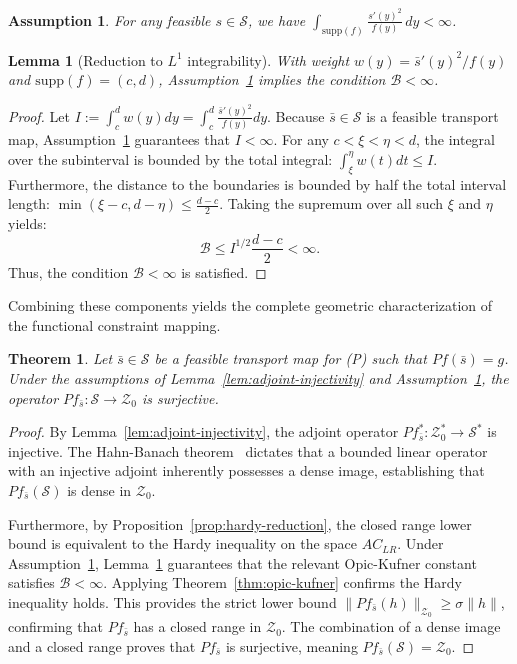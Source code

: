 \documentclass[12pt,leqno]{amsart}
\newtheorem{theorem}{Theorem}
\newtheorem{assumption}{Assumption}
\newtheorem{lemma}{Lemma}
\begin{document}
\begin{assumption}\label{ass:hardy}
For any feasible $s\in\mathcal{S}$, we have $\int_{\mathrm{supp}(f)} \frac{s'(y)^2}{f(y)}\,dy < \infty$.
\end{assumption}

\begin{lemma}[Reduction to $L^1$ integrability]\label{lem:L1-reduction}
With weight $w(y) = \bar{s}'(y)^2/f(y)$ and $\mathrm{supp}(f) = (c,d)$, Assumption~\ref{ass:hardy} implies the condition $\mathcal{B} < \infty$.
\end{lemma}
\begin{proof}
Let $I := \int_c^d w(y)dy = \int_c^d \frac{\bar{s}'(y)^2}{f(y)}dy$. Because $\bar{s} \in \mathcal{S}$ is a feasible transport map, Assumption~\ref{ass:hardy} guarantees that $I < \infty$. For any $c < \xi < \eta < d$, the integral over the subinterval is bounded by the total integral: $\int_\xi^\eta w(t)dt \le I$. Furthermore, the distance to the boundaries is bounded by half the total interval length: $\min(\xi-c, d-\eta) \le \frac{d-c}{2}$. 
Taking the supremum over all such $\xi$ and $\eta$ yields:
\[
\mathcal{B} \le I^{1/2} \frac{d-c}{2} < \infty.
\]
Thus, the condition $\mathcal{B} < \infty$ is satisfied.
\end{proof}

Combining these components yields the complete geometric characterization of the functional constraint mapping.

\begin{theorem}\label{thm:pf-surjectivity}
Let $\bar{s} \in \mathcal{S}$ be a feasible transport map for (P) such that $Pf(\bar{s})=g$. Under the assumptions of Lemma~\ref{lem:adjoint-injectivity} and Assumption~\ref{ass:hardy}, the operator $Pf_{\bar{s}} : \mathcal{S} \to \mathcal{Z}_0$ is surjective. 
\end{theorem}
\begin{proof}
By Lemma~\ref{lem:adjoint-injectivity}, the adjoint operator $Pf_{\bar{s}}^* : \mathcal{Z}_0^* \to \mathcal{S}^*$ is injective. The Hahn-Banach theorem~\citep[Theorem 3.2]{Rudin1974FunctionalAnalysis} dictates that a bounded linear operator with an injective adjoint inherently possesses a dense image, establishing that $Pf_{\bar{s}}(\mathcal{S})$ is dense in $\mathcal{Z}_0$. 

Furthermore, by Proposition~\ref{prop:hardy-reduction}, the closed range lower bound is equivalent to the Hardy inequality on the space $AC_{LR}$. Under Assumption~\ref{ass:hardy}, Lemma~\ref{lem:L1-reduction} guarantees that the relevant Opic-Kufner constant satisfies $\mathcal{B} < \infty$. Applying Theorem~\ref{thm:opic-kufner} confirms the Hardy inequality holds. This provides the strict lower bound $\|Pf_{\bar{s}}(h)\|_{\mathcal{Z}_0} \ge \sigma\|h\|$, confirming that $Pf_{\bar{s}}$ has a closed range in $\mathcal{Z}_0$. The combination of a dense image and a closed range proves that $Pf_{\bar{s}}$ is surjective, meaning $Pf_{\bar{s}}(\mathcal{S}) = \mathcal{Z}_0$. 
\end{proof}
\end{document}
